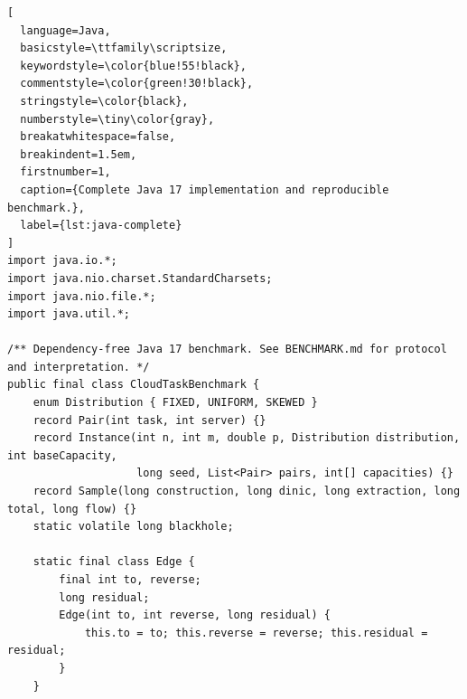\documentclass[conference]{IEEEtran}
\theoremstyle{definition}
\theoremstyle{remark}
\begin{document}
\begin{lstlisting}[
  language=Java,
  basicstyle=\ttfamily\scriptsize,
  keywordstyle=\color{blue!55!black},
  commentstyle=\color{green!30!black},
  stringstyle=\color{black},
  numberstyle=\tiny\color{gray},
  breakatwhitespace=false,
  breakindent=1.5em,
  firstnumber=1,
  caption={Complete Java 17 implementation and reproducible benchmark.},
  label={lst:java-complete}
]
import java.io.*;
import java.nio.charset.StandardCharsets;
import java.nio.file.*;
import java.util.*;

/** Dependency-free Java 17 benchmark. See BENCHMARK.md for protocol and interpretation. */
public final class CloudTaskBenchmark {
    enum Distribution { FIXED, UNIFORM, SKEWED }
    record Pair(int task, int server) {}
    record Instance(int n, int m, double p, Distribution distribution, int baseCapacity,
                    long seed, List<Pair> pairs, int[] capacities) {}
    record Sample(long construction, long dinic, long extraction, long total, long flow) {}
    static volatile long blackhole;

    static final class Edge {
        final int to, reverse;
        long residual;
        Edge(int to, int reverse, long residual) {
            this.to = to; this.reverse = reverse; this.residual = residual;
        }
    }


\end{lstlisting}
\end{document}
